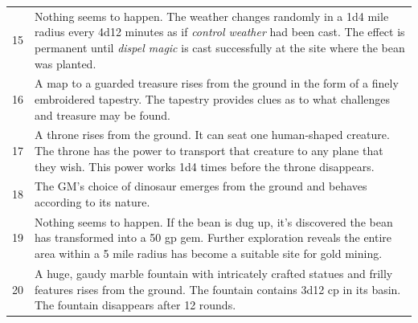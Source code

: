 \begin{longtable}{|p{}|p{}|}
\rowcolor[gray]{0.9}15	& Nothing seems to happen.  The weather changes randomly  in a 1d4 mile radius every 4d12 minutes as if \textit{control weather} had been cast.  The effect is permanent until \textit{dispel magic} is cast successfully at the site where the bean was planted. \\
16	& A map to a guarded treasure rises from the ground in the form of a finely embroidered tapestry.  The tapestry provides clues as to what challenges and treasure may be found. \\
\rowcolor[gray]{0.9}17	& A throne rises from the ground.  It can seat one human-shaped creature.  The throne has the power to transport that creature to any plane that they wish.  This power works 1d4 times before the throne disappears. \\
18	& The GM's choice of dinosaur emerges from the ground and behaves according to its nature. \\
\rowcolor[gray]{0.9}19	& Nothing seems to happen.  If the bean is dug up, it's discovered the bean has transformed into a 50 gp gem.  Further exploration reveals the entire area within a 5 mile radius has become a suitable site for gold mining. \\
20	& A huge, gaudy marble fountain with intricately crafted statues and frilly features rises from the ground.  The fountain contains 3d12 cp in its basin.  The fountain disappears after 12 rounds. \\
\end{longtable}

